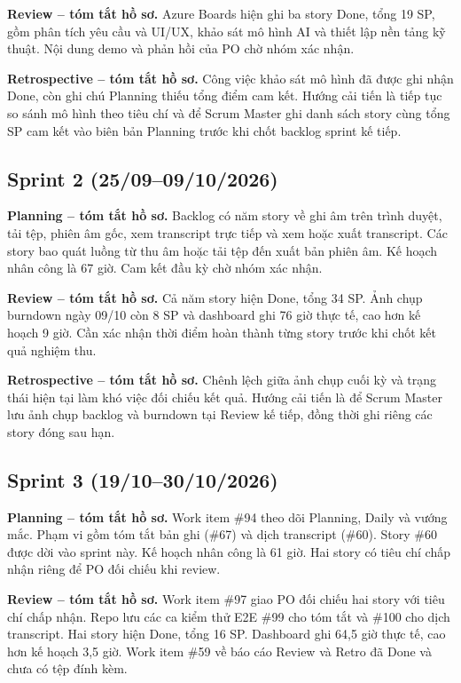 \documentclass[12pt,a4paper]{report}
\begin{document}
\textbf{Review -- tóm tắt hồ sơ.} Azure Boards hiện ghi ba story Done, tổng 19 SP, gồm phân tích yêu cầu và UI/UX,
khảo sát mô hình AI và thiết lập nền tảng kỹ thuật. Nội dung demo và phản hồi của PO chờ nhóm xác nhận.

\textbf{Retrospective -- tóm tắt hồ sơ.} Công việc khảo sát mô hình đã được ghi nhận Done, còn ghi chú Planning
thiếu tổng điểm cam kết. Hướng cải tiến là tiếp tục so sánh mô hình theo tiêu chí và để Scrum Master ghi danh sách
story cùng tổng SP cam kết vào biên bản Planning trước khi chốt backlog sprint kế tiếp.

\subsection*{Sprint 2 (25/09--09/10/2026)}

\textbf{Planning -- tóm tắt hồ sơ.} Backlog có năm story về ghi âm trên trình duyệt, tải tệp, phiên âm gốc, xem
transcript trực tiếp và xem hoặc xuất transcript. Các story bao quát luồng từ thu âm hoặc tải tệp đến xuất
bản phiên âm. Kế hoạch nhân công là 67 giờ. Cam kết đầu kỳ chờ nhóm xác nhận.

\textbf{Review -- tóm tắt hồ sơ.} Cả năm story hiện Done, tổng 34 SP. Ảnh chụp burndown ngày 09/10 còn 8 SP và
dashboard ghi 76 giờ thực tế, cao hơn kế hoạch 9 giờ. Cần xác nhận thời điểm hoàn thành từng story trước khi
chốt kết quả nghiệm thu.

\textbf{Retrospective -- tóm tắt hồ sơ.} Chênh lệch giữa ảnh chụp cuối kỳ và trạng thái hiện tại làm khó việc
đối chiếu kết quả. Hướng cải tiến là để Scrum Master lưu ảnh chụp backlog và burndown tại Review kế tiếp,
đồng thời ghi riêng các story đóng sau hạn.

\subsection*{Sprint 3 (19/10--30/10/2026)}

\textbf{Planning -- tóm tắt hồ sơ.} Work item \#94 theo dõi Planning, Daily và vướng mắc. Phạm vi gồm
tóm tắt bản ghi (\#67) và dịch transcript (\#60). Story \#60 được dời vào sprint này. Kế hoạch nhân công là 61 giờ.
Hai story có tiêu chí chấp nhận riêng để PO đối chiếu khi review.

\textbf{Review -- tóm tắt hồ sơ.} Work item \#97 giao PO đối chiếu hai story với tiêu chí chấp nhận. Repo lưu
các ca kiểm thử E2E \#99 cho tóm tắt và \#100 cho dịch transcript. Hai story hiện Done, tổng 16 SP.
Dashboard ghi 64,5 giờ thực tế, cao hơn kế hoạch 3,5 giờ.
Work item \#59 về báo cáo Review và Retro đã Done và chưa có tệp đính kèm.
\end{document}
